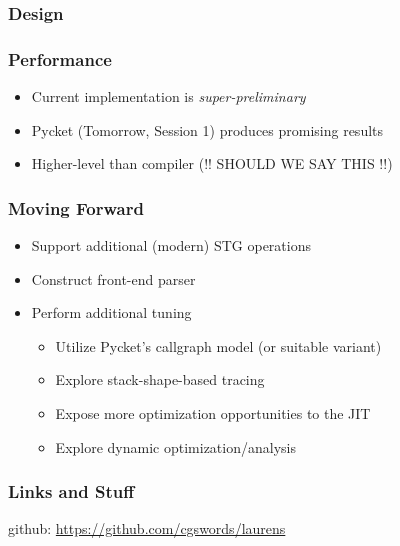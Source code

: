 \documentclass[xetex,serif,mathserif]{beamer}
\newenvironment{slide}[1]{\begin{frame}\frametitle{#1}}{\end{frame}}
\begin{document}
\begin{slide}{Design}
\end{slide}

\begin{slide}{Performance}
  \begin{itemize}
    \item Current implementation is \emph{super-preliminary}
    \item Pycket (Tomorrow, Session 1) produces promising results
    \item Higher-level than compiler  (!! SHOULD WE SAY THIS !!)
  \end{itemize}
\end{slide}

\begin{slide}{Moving Forward}
  \begin{itemize}
    \item Support additional (modern) STG operations
    \item Construct front-end parser
    \item Perform additional tuning
    \begin{itemize}
      \item Utilize Pycket's callgraph model (or suitable variant)
      \item Explore stack-shape-based tracing
      \item Expose more optimization opportunities to the JIT
      \item Explore dynamic optimization/analysis
    \end{itemize}
  \end{itemize}
\end{slide}

\begin{slide}{Links and Stuff}
    \begin{center}
        github: \href{https://github.com/cgswords/laurens}{https://github.com/cgswords/laurens}
    \end{center}
\end{slide}
\end{document}
